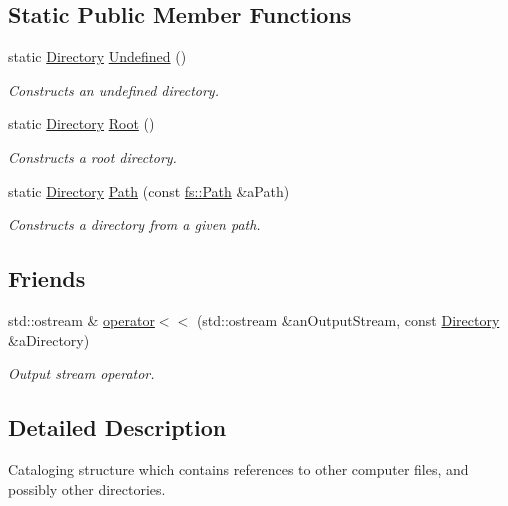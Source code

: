 \subsection*{Static Public Member Functions}
\begin{DoxyCompactItemize}
\item 
static \hyperlink{classlibrary_1_1core_1_1fs_1_1_directory}{Directory} \hyperlink{classlibrary_1_1core_1_1fs_1_1_directory_a448eafac782d46d3e7764aaf6d9beed0}{Undefined} ()
\begin{DoxyCompactList}\small\item\em Constructs an undefined directory. \end{DoxyCompactList}\item 
static \hyperlink{classlibrary_1_1core_1_1fs_1_1_directory}{Directory} \hyperlink{classlibrary_1_1core_1_1fs_1_1_directory_a617eb0d4858dd8e2b69a6c5e7b645d8c}{Root} ()
\begin{DoxyCompactList}\small\item\em Constructs a root directory. \end{DoxyCompactList}\item 
static \hyperlink{classlibrary_1_1core_1_1fs_1_1_directory}{Directory} \hyperlink{classlibrary_1_1core_1_1fs_1_1_directory_ae906e33e4659219cf296dd314c7726b8}{Path} (const \hyperlink{classlibrary_1_1core_1_1fs_1_1_path}{fs\+::\+Path} \&a\+Path)
\begin{DoxyCompactList}\small\item\em Constructs a directory from a given path. \end{DoxyCompactList}\end{DoxyCompactItemize}
\subsection*{Friends}
\begin{DoxyCompactItemize}
\item 
std\+::ostream \& \hyperlink{classlibrary_1_1core_1_1fs_1_1_directory_a3cbfede39f82ab145f110ca14e21deef}{operator$<$$<$} (std\+::ostream \&an\+Output\+Stream, const \hyperlink{classlibrary_1_1core_1_1fs_1_1_directory}{Directory} \&a\+Directory)
\begin{DoxyCompactList}\small\item\em Output stream operator. \end{DoxyCompactList}\end{DoxyCompactItemize}


\subsection{Detailed Description}
Cataloging structure which contains references to other computer files, and possibly other directories. 

